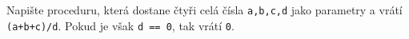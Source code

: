 \question[30]
Napište proceduru, která dostane čtyři celá čísla \texttt{a,b,c,d} jako
parametry a vrátí
\texttt{(a+b+c)/d}. Pokud je však \texttt{d == 0}, tak
vrátí \texttt{0}.
